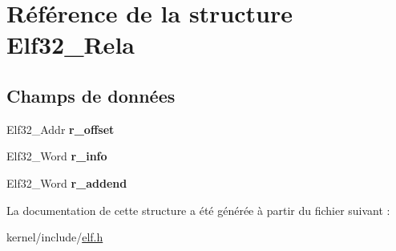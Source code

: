 \hypertarget{structElf32__Rela}{\section{Référence de la structure Elf32\+\_\+\+Rela}
\label{structElf32__Rela}
}
\subsection*{Champs de données}
\begin{DoxyCompactItemize}
\item 
\hypertarget{structElf32__Rela_aa850a306ee7fa3935a9f8c3d1aae4e51}{Elf32\+\_\+\+Addr {\bfseries r\+\_\+offset}}\label{structElf32__Rela_aa850a306ee7fa3935a9f8c3d1aae4e51}

\item 
\hypertarget{structElf32__Rela_ac3a79d3f04209c33ddb4c36d07e68a79}{Elf32\+\_\+\+Word {\bfseries r\+\_\+info}}\label{structElf32__Rela_ac3a79d3f04209c33ddb4c36d07e68a79}

\item 
\hypertarget{structElf32__Rela_ad6d06a60c911de065e4a65194d1c899a}{Elf32\+\_\+\+Word {\bfseries r\+\_\+addend}}\label{structElf32__Rela_ad6d06a60c911de065e4a65194d1c899a}

\end{DoxyCompactItemize}


La documentation de cette structure a été générée à partir du fichier suivant \+:\begin{DoxyCompactItemize}
\item 
kernel/include/\hyperlink{elf_8h}{elf.\+h}\end{DoxyCompactItemize}
